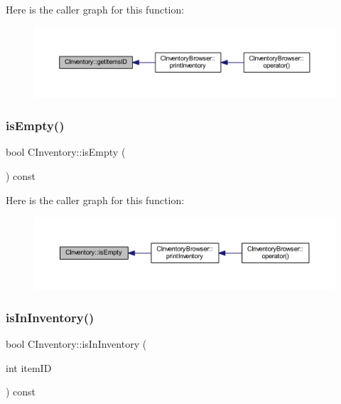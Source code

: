 Here is the caller graph for this function\+:\nopagebreak
\begin{figure}[H]
\begin{center}
\leavevmode
\includegraphics[width=350pt]{class_c_inventory_a473699b2949d4c6c19853f5047fa7737_icgraph}
\end{center}
\end{figure}
\mbox{\label{class_c_inventory_a3fe6ee0c2de70f3e2d9278e43f125fe9}} 
\subsubsection{\texorpdfstring{is\+Empty()}{isEmpty()}}
{\footnotesize\ttfamily bool C\+Inventory\+::is\+Empty (\begin{DoxyParamCaption}{ }\end{DoxyParamCaption}) const\hspace{0.3cm}{\ttfamily [inline]}}

Here is the caller graph for this function\+:\nopagebreak
\begin{figure}[H]
\begin{center}
\leavevmode
\includegraphics[width=350pt]{class_c_inventory_a3fe6ee0c2de70f3e2d9278e43f125fe9_icgraph}
\end{center}
\end{figure}
\mbox{\label{class_c_inventory_abd92c94b31dc928c1047423e98309bd7}} 
\subsubsection{\texorpdfstring{is\+In\+Inventory()}{isInInventory()}}
{\footnotesize\ttfamily bool C\+Inventory\+::is\+In\+Inventory (\begin{DoxyParamCaption}\item[{int}]{item\+ID }\end{DoxyParamCaption}) const\hspace{0.3cm}{\ttfamily [inline]}}

